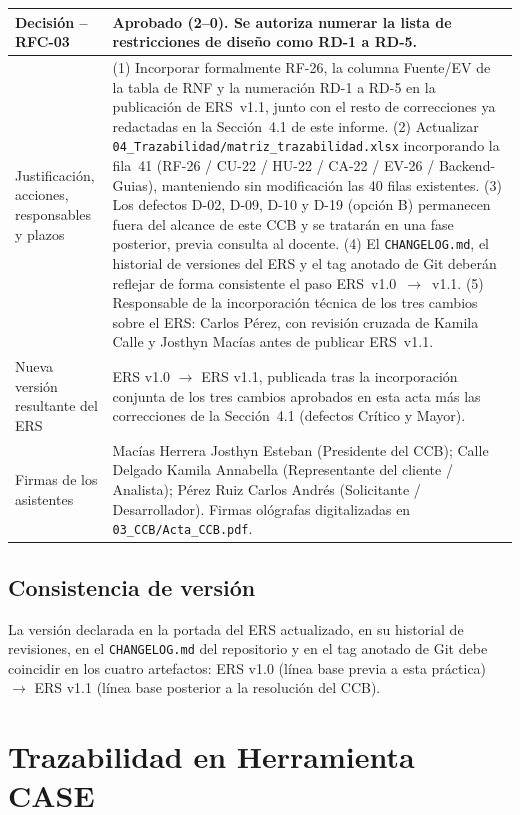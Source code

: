 \documentclass[11pt,a4paper]{article}
\begin{document}
\begin{longtable}{|p{4.5cm}|p{9.5cm}|}
\hline
Decisión -- RFC-03 & Aprobado (2--0). Se autoriza numerar la lista de restricciones de diseño como RD-1 a RD-5. \\
\hline
Justificación, acciones, responsables y plazos & (1) Incorporar formalmente RF-26, la columna Fuente/EV de la tabla de RNF y la numeración RD-1 a RD-5 en la publicación de ERS~v1.1, junto con el resto de correcciones ya redactadas en la Sección~4.1 de este informe. (2) Actualizar \texttt{04\_Trazabilidad/matriz\_trazabilidad.xlsx} incorporando la fila~41 (RF-26 / CU-22 / HU-22 / CA-22 / EV-26 / Backend-Guias), manteniendo sin modificación las 40 filas existentes. (3) Los defectos D-02, D-09, D-10 y D-19 (opción B) permanecen fuera del alcance de este CCB y se tratarán en una fase posterior, previa consulta al docente. (4) El \texttt{CHANGELOG.md}, el historial de versiones del ERS y el tag anotado de Git deberán reflejar de forma consistente el paso ERS~v1.0~$\rightarrow$~v1.1. (5) Responsable de la incorporación técnica de los tres cambios sobre el ERS: Carlos Pérez, con revisión cruzada de Kamila Calle y Josthyn Macías antes de publicar ERS~v1.1. \\
\hline
Nueva versión resultante del ERS & ERS v1.0 $\rightarrow$ ERS v1.1, publicada tras la incorporación conjunta de los tres cambios aprobados en esta acta más las correcciones de la Sección~4.1 (defectos Crítico y Mayor). \\
\hline
Firmas de los asistentes & Macías Herrera Josthyn Esteban (Presidente del CCB); Calle Delgado Kamila Annabella (Representante del cliente / Analista); Pérez Ruiz Carlos Andrés (Solicitante / Desarrollador). Firmas ológrafas digitalizadas en \texttt{03\_CCB/Acta\_CCB.pdf}. \\
\hline
\end{longtable}

\subsection{Consistencia de versión}
La versión declarada en la portada del ERS actualizado, en su historial de revisiones, en el \texttt{CHANGELOG.md} del repositorio y en el tag anotado de Git debe coincidir en los cuatro artefactos: ERS v1.0 (línea base previa a esta práctica) $\rightarrow$ ERS v1.1 (línea base posterior a la resolución del CCB).

\section{Trazabilidad en Herramienta CASE}
\label{sec:trazabilidad-case}
\end{document}
